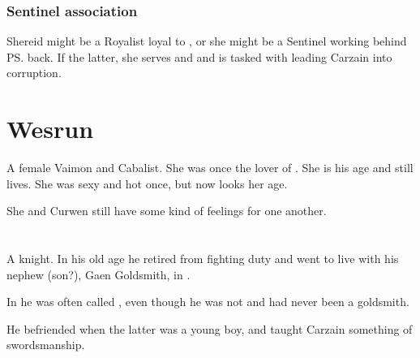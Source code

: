 \subsubsection{Sentinel association}
Shereid might be a Royalist loyal to \Belzir, or she might be a Sentinel working behind \ps{\Belzir}{} back. If the latter, she serves \Psyrex{} and \Secherdamon{} and is tasked with leading Carzain into corruption. 















\section{Wesrun}
A female \human{} Vaimon and Cabalist. 
She was once the lover of . 
She is his age and still lives. 
She was sexy and hot once, but now looks her age. 

She and Curwen still have some kind of feelings for one another. 















\section[Weylon]{\Rah{\Weylon}}
\index{\rah[\Weylon]}
A  knight.
In his old age he retired from fighting duty and went to live with his nephew (son?), Gaen Goldsmith, in . 

In \Redglen{} he was often called , even though he was not and had never been a goldsmith. 

He befriended  when the latter was a young boy, and taught Carzain something of swordsmanship. 












































